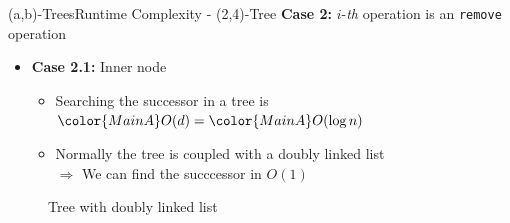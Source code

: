 \begin{frame}{(a,b)-Trees}{Runtime Complexity - (2,4)-Tree}
  \textbf{Case 2:}
  {\color{MainA}$i$}-\textit{th} operation is an
  \texttt{\color{MainA}remove} operation
  \begin{itemize}
    \item<2->
      \textbf{Case 2.1:} Inner node
      \begin{itemize}
        \item<3->
         Searching the successor in a tree is
          \begin{math}
           {\color{MainA}O(d)} =
           {\color{MainA}O(\log n)}
          \end{math}
        \item<4->
          Normally the tree is coupled with a doubly linked list\\
          $\Rightarrow$ We can find the succcessor in
          {\color{MainA}$O(1)$}
    \end{itemize}
  \end{itemize}
  \vspace{0.5em}
  \begin{figure}
    \begin{adjustbox}{width=0.75\linewidth}
      
    \end{adjustbox}
    \caption{Tree with doubly linked list}
    \label{fig:a_b_tree:doubly_linked_list}
  \end{figure}
\end{frame}


